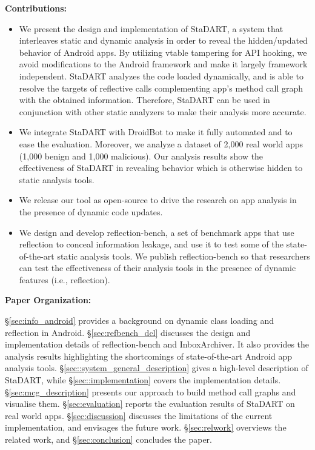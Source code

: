 \textbf{Contributions:}

\begin{itemize}
\item We present the design and implementation of StaDART, a system that interleaves static and dynamic analysis in order to reveal the hidden/updated behavior of Android apps. By utilizing vtable tampering for API hooking, we avoid modifications to the Android framework and make it largely framework independent. StaDART analyzes the code loaded dynamically, and is able to resolve the targets of reflective calls complementing app's method call graph with the obtained information. Therefore, StaDART can be used in conjunction with other static analyzers to make their analysis more accurate.

\item We integrate StaDART with DroidBot to make it fully automated and to ease the evaluation. Moreover, we analyze a dataset of 2,000 real world apps (1,000 benign and 1,000 malicious). Our analysis results show the effectiveness of StaDART in revealing behavior which is otherwise hidden to static analysis tools.  

\item We release our tool as open-source to drive the research on app analysis in the presence of dynamic code updates.
\item We design and develop reflection-bench, a set of benchmark apps that use reflection to conceal information leakage, and use it to test some of the state-of-the-art static analysis tools. We publish reflection-bench so that researchers can test the effectiveness of their analysis tools in the presence of dynamic features (i.e., reflection). 

\end{itemize}

\textbf{Paper Organization:}

\S\ref{sec:info_android} provides a background on dynamic class loading and reflection in Android. 
\S\ref{sec:refbench_dcl} discusses the design and implementation details of reflection-bench and InboxArchiver. It also provides the analysis results highlighting the shortcomings of state-of-the-art Android app analysis tools. \S\ref{sec::system_general_description} gives a high-level description of StaDART, while \S\ref{sec::implementation} covers the implementation details. \S \ref{sec:mcg_description} presents our approach to build method call graphs and visualise them. \S\ref{sec:evaluation} reports the evaluation results of StaDART on real world apps. \S\ref{sec:discussion} discusses the limitations of the current implementation, and envisages the future work. \S\ref{sec:relwork} overviews the related work, and \S\ref{sec:conclusion} concludes the paper.

